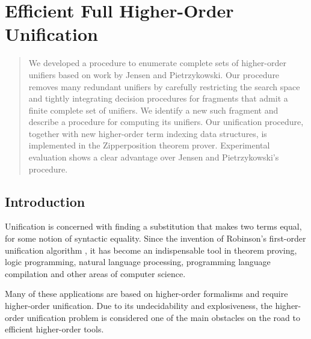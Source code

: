 \chapter{Efficient Full Higher-Order Unification}
\label{ch:unif}



\begin{abstract}
  We developed a procedure to enumerate complete sets of higher-order unifiers based on work
  by Jensen and Pietrzykowski. Our procedure removes many redundant unifiers by
  carefully restricting the search space and tightly integrating decision
  procedures for fragments that admit a finite complete set of unifiers. We
  identify a new such fragment and describe a procedure for computing its unifiers.
  Our unification procedure, together with new higher-order term indexing data structures, 
  is implemented in the Zipperposition theorem prover.
  Experimental evaluation shows a clear advantage over Jensen and Pietrzykowski's
  procedure.    
\end{abstract}
    
\newpage

\section{Introduction}
\label{sec:unif:intro}

Unification is concerned with finding a substitution that makes two terms
equal, for some notion of syntactic equality. Since the invention of Robinson's first-order unification
algorithm \cite{ar-65-resolution}, it has become an indispensable
tool in theorem proving, logic
programming, natural language processing, programming language compilation and other areas of computer science.

Many of these applications are based on higher-order formalisms and require
higher-order unification. Due to its undecidability and explosiveness,
the higher-order unification problem is considered one of the main
obstacles on the road to efficient higher-order tools.

